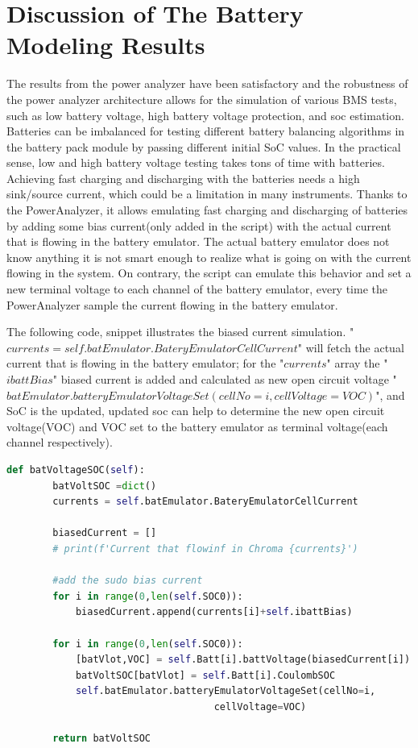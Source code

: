 \section{Discussion of The Battery Modeling Results}
The results from the power analyzer have been satisfactory and the robustness of the power analyzer architecture allows for the simulation of various BMS tests, such as low battery voltage, high battery voltage protection, and soc estimation.
Batteries can be imbalanced for testing different battery balancing algorithms in the battery pack module by passing different initial SoC values. In the practical sense, low and high battery voltage testing takes tons of time with batteries. Achieving fast charging and discharging with the batteries needs a high sink/source current, which could be a limitation in many instruments. Thanks to the PowerAnalyzer, it allows emulating fast charging and discharging of batteries by adding some bias current(only added in the script) with the actual current that is flowing in the battery emulator. The actual battery emulator does not know anything it is not smart enough to realize what is going on with the current flowing in the system. On contrary, the script can emulate this behavior and set a new terminal voltage to each channel of the battery emulator, every time the PowerAnalyzer sample the current flowing in the battery emulator.

The following code, snippet illustrates the biased current simulation. "$currents = self.batEmulator.BateryEmulatorCellCurrent$" will fetch the actual current that is flowing in the battery emulator; for the "$currents$" array the "$ibattBias$" biased current is added and calculated as new open circuit voltage "$batEmulator.batteryEmulatorVoltageSet(cellNo=i,cellVoltage=VOC)$", and SoC is the updated, updated soc can help to determine the new open circuit voltage(VOC) and VOC set to the battery emulator as terminal voltage(each channel respectively).
\begin{lstlisting}[language=Python, caption=Emulating Sudo BiasCurrent in the PowerAnalyzer ]
    def batVoltageSOC(self):
        batVoltSOC =dict()
        currents = self.batEmulator.BateryEmulatorCellCurrent
        
        biasedCurrent = []
        # print(f'Current that flowinf in Chroma {currents}')
        
        #add the sudo bias current 
        for i in range(0,len(self.SOC0)):
            biasedCurrent.append(currents[i]+self.ibattBias)
                
        for i in range(0,len(self.SOC0)):
            [batVlot,VOC] = self.Batt[i].battVoltage(biasedCurrent[i])
            batVoltSOC[batVlot] = self.Batt[i].CoulombSOC
            self.batEmulator.batteryEmulatorVoltageSet(cellNo=i,
                                    cellVoltage=VOC)
            
        return batVoltSOC
\end{lstlisting}

